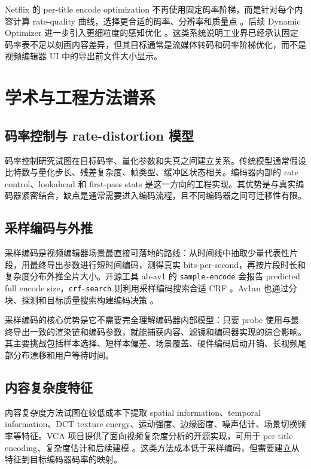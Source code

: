 \documentclass[UTF8,a4paper,11pt]{ctexart}
\begin{document}
Netflix 的 per-title encode optimization 不再使用固定码率阶梯，而是针对每个内容计算 rate-quality 曲线，选择更合适的码率、分辨率和质量点 \cite{netflix_per_title}。后续 Dynamic Optimizer 进一步引入更细粒度的感知优化 \cite{netflix_dynamic_optimizer}。这类系统说明工业界已经承认固定码率表不足以刻画内容差异，但其目标通常是流媒体转码和码率阶梯优化，而不是视频编辑器 UI 中的导出前文件大小显示。

\section{学术与工程方法谱系}

\subsection{码率控制与 rate-distortion 模型}

码率控制研究试图在目标码率、量化参数和失真之间建立关系。传统模型通常假设比特数与量化步长、残差复杂度、帧类型、缓冲区状态相关。编码器内部的 rate control、lookahead 和 first-pass stats 是这一方向的工程实现。其优势是与真实编码器紧密结合，缺点是通常需要进入编码流程，且不同编码器之间可迁移性有限。

\subsection{采样编码与外推}

采样编码是视频编辑器场景最直接可落地的路线：从时间线中抽取少量代表性片段，用最终导出参数进行短时间编码，测得真实 bits-per-second，再按片段时长和复杂度分布外推全片大小。开源工具 ab-av1 的 \texttt{sample-encode} 会报告 predicted full encode size，\texttt{crf-search} 则利用采样编码搜索合适 CRF \cite{ab_av1}。Av1an 也通过分块、探测和目标质量搜索构建编码决策 \cite{av1an_target_quality}。

采样编码的核心优势是它不需要完全理解编码器内部模型：只要 probe 使用与最终导出一致的渲染链和编码参数，就能捕获内容、滤镜和编码器实现的综合影响。其主要挑战包括样本选择、短样本偏差、场景覆盖、硬件编码启动开销、长视频尾部分布漂移和用户等待时间。

\subsection{内容复杂度特征}

内容复杂度方法试图在较低成本下提取 spatial information、temporal information、DCT texture energy、运动强度、边缘密度、噪声估计、场景切换频率等特征。VCA 项目提供了面向视频复杂度分析的开源实现，可用于 per-title encoding、复杂度估计和后续建模 \cite{vca_project}。这类方法成本低于采样编码，但需要建立从特征到目标编码器码率的映射。
\end{document}
